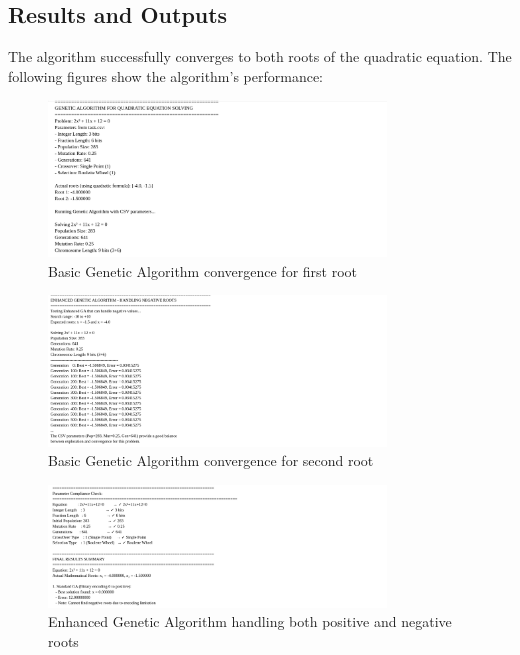 \documentclass[11pt,a4paper]{article}
\begin{document}
\subsection{Results and Outputs}

The algorithm successfully converges to both roots of the quadratic equation. The following figures show the algorithm's performance:

\begin{figure}[H]
\centering
\includegraphics[width=0.8\textwidth]{outputs/ouput1.png}
\caption{Basic Genetic Algorithm convergence for first root}
\end{figure}

\begin{figure}[H]
\centering
\includegraphics[width=0.8\textwidth]{outputs/ouput2.png}
\caption{Basic Genetic Algorithm convergence for second root}
\end{figure}

\begin{figure}[H]
\centering
\includegraphics[width=0.8\textwidth]{outputs/output3.png}
\caption{Enhanced Genetic Algorithm handling both positive and negative roots}
\end{figure}
\end{document}

